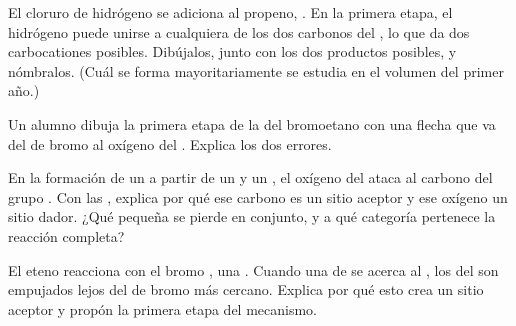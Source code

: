 \begin{exercise}[$\star\star\star$]\label{exo:g12:curly-arrows:12}
El cloruro de hidrógeno se adiciona al propeno, . En la
primera etapa, el  hidrógeno puede unirse a cualquiera de los dos
carbonos del , lo que da dos carbocationes posibles.
Dibújalos, junto con los dos productos posibles, y nómbralos. (Cuál se
forma mayoritariamente se estudia en el volumen del primer año.)
\end{exercise}

\begin{exercise}[$\star\star\star$]\label{exo:g12:curly-arrows:13}
Un alumno dibuja la primera etapa de la  del bromoetano con
una flecha que va del  de bromo al oxígeno del . Explica los
dos errores.
\end{exercise}

\begin{exercise}[$\star\star\star$]\label{exo:g12:curly-arrows:14}
En la formación de un  a partir de un  y un
, el oxígeno del  ataca al carbono del grupo . Con
las , explica por qué ese carbono es un sitio aceptor y
ese oxígeno un sitio dador. ¿Qué  pequeña se pierde en conjunto,
y a qué categoría pertenece la reacción completa?
\end{exercise}

\begin{exercise}[$\star\star\star$]\label{exo:g12:curly-arrows:15}
El eteno reacciona con el bromo , una . Cuando una
 de  se acerca al , los  del
 son empujados lejos del  de bromo más cercano. Explica por
qué esto crea un sitio aceptor y propón la primera etapa del mecanismo.
\end{exercise}

